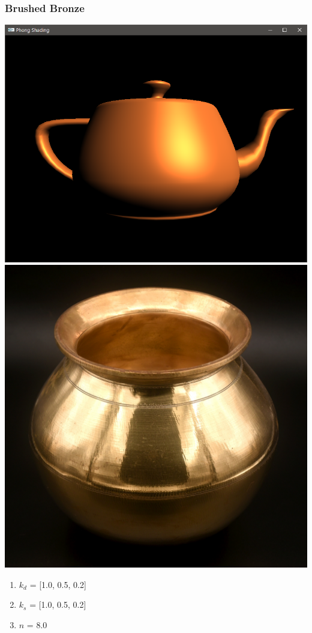 \documentclass{beamer}
\begin{document}
\begin{frame}
    \frametitle{Brushed Bronze}

    \begin{center}
        \includegraphics[scale=0.18]{q5-bronze.png}
        \includegraphics[scale=0.1]{bronze-pot.jpg}
    \end{center}

    \begin{enumerate}
        \item $k_d$ = [1.0, 0.5, 0.2]
        \item $k_s$ = [1.0, 0.5, 0.2]
        \item $n$ = 8.0
    \end{enumerate}

\end{frame}
\end{document}
